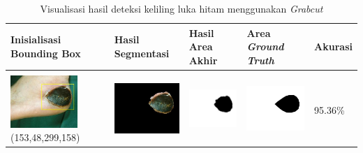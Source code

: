 \begin{table}[H]
	\centering
	\caption{Visualisasi hasil deteksi keliling luka hitam menggunakan \emph{Grabcut}}
	\label{tabel_hasil_1}
	\begin{tabular}{|m{1.0in}|m{1.0in}|m{1.0in}|m{1.0in}|m{0.6in}|}
		\hline
		\textbf{Inisialisasi Bounding Box} & \textbf{Hasil Segmentasi} & \textbf{Hasil Area Akhir} & \textbf{Area \emph{Ground Truth}} & \textbf{Akurasi} \\
		\hline
		
		&  &  & \\
		\includegraphics[width=1.0in]{gambar/hasil_segmentasi/luka_hitam/image_2_rect.jpg} {\centering\fontsize{10}{10}\selectfont(153,48,299,158)}&
		\includegraphics[width=1.0in]{gambar/hasil_segmentasi/luka_hitam/result_2.jpg}&
		\includegraphics[width=1.0in]{gambar/hasil_segmentasi/luka_hitam/mask_r_2.jpg}&
		\includegraphics[width=1.0in]{gambar/hasil_segmentasi/luka_hitam/2_r.jpg}&
		95.36\% \\
		\hline


\end{tabular}
\end{table}
